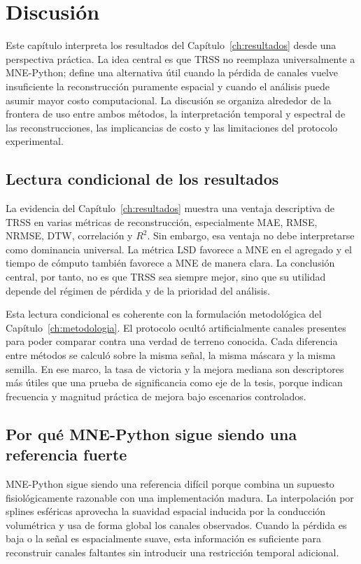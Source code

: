 \chapter{Discusión}
\label{ch:discusion}

Este capítulo interpreta los resultados del Capítulo~\ref{ch:resultados} desde una perspectiva práctica. La idea central es que TRSS no reemplaza universalmente a MNE-Python; define una alternativa útil cuando la pérdida de canales vuelve insuficiente la reconstrucción puramente espacial y cuando el análisis puede asumir mayor costo computacional. La discusión se organiza alrededor de la frontera de uso entre ambos métodos, la interpretación temporal y espectral de las reconstrucciones, las implicancias de costo y las limitaciones del protocolo experimental.

\section{Lectura condicional de los resultados}

La evidencia del Capítulo~\ref{ch:resultados} muestra una ventaja descriptiva de TRSS en varias métricas de reconstrucción, especialmente MAE, RMSE, NRMSE, DTW, correlación y $R^2$. Sin embargo, esa ventaja no debe interpretarse como dominancia universal. La métrica LSD favorece a MNE en el agregado y el tiempo de cómputo también favorece a MNE de manera clara. La conclusión central, por tanto, no es que TRSS sea siempre mejor, sino que su utilidad depende del régimen de pérdida y de la prioridad del análisis.

Esta lectura condicional es coherente con la formulación metodológica del Capítulo~\ref{ch:metodologia}. El protocolo ocultó artificialmente canales presentes para poder comparar contra una verdad de terreno conocida. Cada diferencia entre métodos se calculó sobre la misma señal, la misma máscara y la misma semilla. En ese marco, la tasa de victoria y la mejora mediana son descriptores más útiles que una prueba de significancia como eje de la tesis, porque indican frecuencia y magnitud práctica de mejora bajo escenarios controlados.

\section{Por qué MNE-Python sigue siendo una referencia fuerte}

MNE-Python sigue siendo una referencia difícil porque combina un supuesto fisiológicamente razonable con una implementación madura. La interpolación por splines esféricas aprovecha la suavidad espacial inducida por la conducción volumétrica y usa de forma global los canales observados. Cuando la pérdida es baja o la señal es espacialmente suave, esta información es suficiente para reconstruir canales faltantes sin introducir una restricción temporal adicional.

